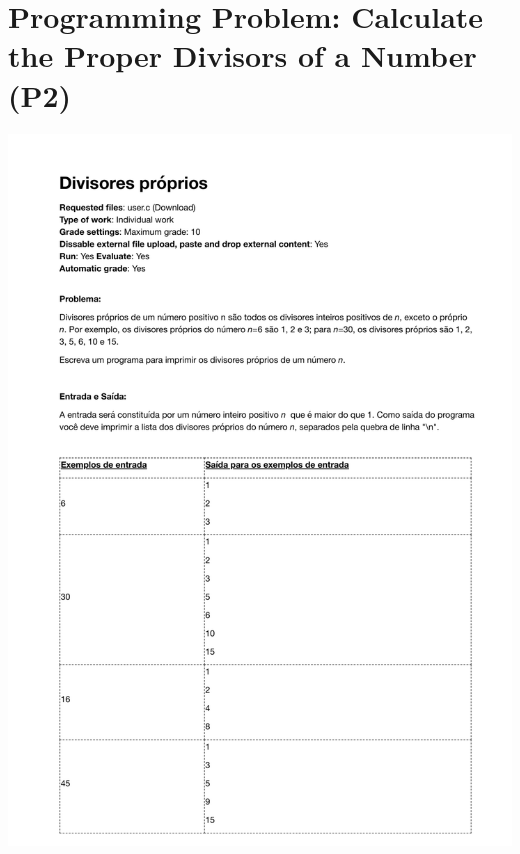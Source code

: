 \section{Programming Problem: Calculate the Proper Divisors of a Number (P2)}
\label{annex:second-study-p2}
\includegraphics[page=1,width=1\textwidth]{images/annex/second-study-p2.pdf}

\newpage
